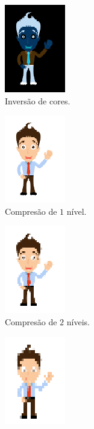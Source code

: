 \documentclass[a4paper]{article}
\begin{document}
\begin{figure}
\begin{subfigure}{0.5\textwidth}
\label{fig:personx2}
\end{subfigure}
%
\begin{subfigure}{0.5\textwidth}
\centering
\includegraphics[width=0.2\linewidth]{cp1718t_media/personinv.png}
\caption{Inversão de cores.}
\label{fig:personinv}
\end{subfigure}
%
\begin{subfigure}{0.5\textwidth}
\centering
\includegraphics[width=0.2\linewidth]{cp1718t_media/person1.png}
\caption{Compresão de $1$ nível.}
\label{fig:person1}
\end{subfigure}
%
\begin{subfigure}{0.5\textwidth}
\centering
\includegraphics[width=0.2\linewidth]{cp1718t_media/person2.png}
\caption{Compresão de $2$ níveis.}
\label{fig:person2}
\end{subfigure}
%
\begin{subfigure}{0.5\textwidth}
\centering
\includegraphics[width=0.2\linewidth]{cp1718t_media/person3.png}

\end{subfigure}
\end{figure}
\end{document}
